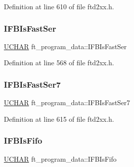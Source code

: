 Definition at line 610 of file ftd2xx.\+h.

\mbox{\label{structft__program__data_ad6220f0e81d216037ba11f65ec73bf4e}} 
\subsubsection{\texorpdfstring{I\+F\+B\+Is\+Fast\+Ser}{IFBIsFastSer}}
{\footnotesize\ttfamily \hyperlink{CatCaloProto40MHz_2inc_2WinTypes_8h_a4f4bb67531a9bf6f0b9c6ad76aeba587}{U\+C\+H\+AR} ft\+\_\+program\+\_\+data\+::\+I\+F\+B\+Is\+Fast\+Ser}



Definition at line 568 of file ftd2xx.\+h.

\mbox{\label{structft__program__data_a3515751d6639407ba0cd1097d477fbb5}} 
\subsubsection{\texorpdfstring{I\+F\+B\+Is\+Fast\+Ser7}{IFBIsFastSer7}}
{\footnotesize\ttfamily \hyperlink{CatCaloProto40MHz_2inc_2WinTypes_8h_a4f4bb67531a9bf6f0b9c6ad76aeba587}{U\+C\+H\+AR} ft\+\_\+program\+\_\+data\+::\+I\+F\+B\+Is\+Fast\+Ser7}



Definition at line 615 of file ftd2xx.\+h.

\mbox{\label{structft__program__data_ad08f06af0e3a427cb6a826f55cc32ff5}} 
\subsubsection{\texorpdfstring{I\+F\+B\+Is\+Fifo}{IFBIsFifo}}
{\footnotesize\ttfamily \hyperlink{CatCaloProto40MHz_2inc_2WinTypes_8h_a4f4bb67531a9bf6f0b9c6ad76aeba587}{U\+C\+H\+AR} ft\+\_\+program\+\_\+data\+::\+I\+F\+B\+Is\+Fifo}




